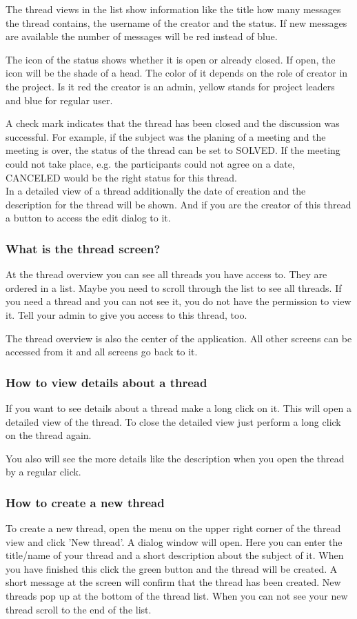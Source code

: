 \documentclass[12pt,a4paper,oneside]{report}
\begin{document}
The thread views in the list show information like the title how many messages the thread contains, the username of the creator and the status. If new messages are available the number of messages will be red instead of blue. 

The icon of the status shows whether it is open or already closed. If open, the icon will be the shade of a head. The color of it depends on the role of creator in the project. Is it red the creator is an admin, yellow stands for project leaders and blue for regular user.
 
A check mark indicates that the thread has been closed and the discussion was successful. For example, if the subject was the planing of a meeting and the meeting is over, the status of the thread can be set to SOLVED. 
If the meeting could not take place, e.g. the participants could not agree on a date, CANCELED would be the right status for this thread.
\\
In a detailed view of a thread additionally the date of creation and the description for the thread will be shown.
And if you are the creator of this thread a button to access the edit dialog to it.


\subsubsection{What is the thread screen?}
At the thread overview you can see all threads you have access to.
They are ordered in a list. Maybe you need to scroll through the list to see all threads. If you need a thread and you can not see it, you do not have the permission to view it. Tell your admin to give you access to this thread, too. 

The thread overview is also the center of the application. All other screens can be accessed from it and all screens go back to it.\\


\subsubsection{How to view details about a thread}
If you want to see details about a thread make a long click on it. This will open a detailed view of the thread. To close the detailed view just perform a long click on the thread again.

You also will see the more details like the description when you open the thread by a regular click.

\subsubsection{How to create a new thread}
To create a new thread, open the menu on the upper right corner of the thread view and click 'New thread'. A dialog window will open. Here you can enter the title/name of your thread and a short description about the subject of it. When you have finished this click the green button and the thread will be created. A short message at the screen will confirm that the thread has been created. New threads pop up at the bottom of the thread list. When you can not see your new thread scroll to the end of the list.
\end{document}
